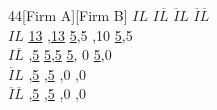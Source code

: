 \documentclass[10.5pt]{article}
\begin{document}
\begin{figure}[h!]
\begin{center}
\begin{footnotesize}
\begin{game}{4}{4}[Firm A][Firm B]
       						 \> $IL$  	\> $I\overline{L}$ 	\> $\overline{I}L$  \> $\overline{I}\overline{L}$   \\
$IL$     					 \> \underline{13} ,\underline{13}  	\> \underline{5},5   		,10			\> \underline{5},5  \\
$I\overline{L}$   			 ,\underline{5}  	\> \underline{5},\underline{5}    	\> \underline{5}, 0 				\> \underline{5},0\\
$\overline{I}L$      		 ,\underline{5}  	,\underline{5}    			\> 0,0 					,0  \\
$\overline{I}\overline{L}$   ,\underline{5} 	,\underline{5}   			\> 0,0 					,0 \\
\end{game}
\end{footnotesize}
\end{center}
\end{figure}
\end{document}
